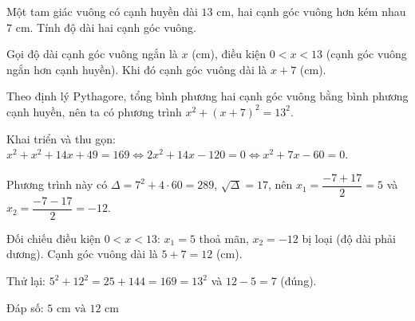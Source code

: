 \begin{problem}[9DS-PT2-044]
Một tam giác vuông có cạnh huyền dài $13$ cm, hai cạnh góc vuông hơn kém nhau $7$ cm. Tính độ dài hai cạnh góc vuông.

\begin{solution}
Gọi độ dài cạnh góc vuông ngắn là $x$ (cm), điều kiện $0 < x < 13$ (cạnh góc vuông ngắn hơn cạnh huyền). Khi đó cạnh góc vuông dài là $x + 7$ (cm).

Theo định lý Pythagore, tổng bình phương hai cạnh góc vuông bằng bình phương cạnh huyền, nên ta có phương trình $x^2 + (x + 7)^2 = 13^2$.

Khai triển và thu gọn: $x^2 + x^2 + 14x + 49 = 169 \Leftrightarrow 2x^2 + 14x - 120 = 0 \Leftrightarrow x^2 + 7x - 60 = 0$.

Phương trình này có $\Delta = 7^2 + 4 \cdot 60 = 289$, $\sqrt{\Delta} = 17$, nên $x_1 = \dfrac{-7 + 17}{2} = 5$ và $x_2 = \dfrac{-7 - 17}{2} = -12$.

Đối chiếu điều kiện $0 < x < 13$: $x_1 = 5$ thoả mãn, $x_2 = -12$ bị loại (độ dài phải dương). Cạnh góc vuông dài là $5 + 7 = 12$ (cm).

Thử lại: $5^2 + 12^2 = 25 + 144 = 169 = 13^2$ và $12 - 5 = 7$ (đúng).

Đáp số: $\boxed{5 \text{ cm và } 12 \text{ cm}}$
\end{solution}
\end{problem}

